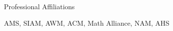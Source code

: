 \documentclass{resume} %
\begin{document}
\begin{rSection}{Professional Affiliations}

AMS, SIAM, AWM, ACM, Math Alliance, NAM, AHS



\end{rSection}






\end{document}
